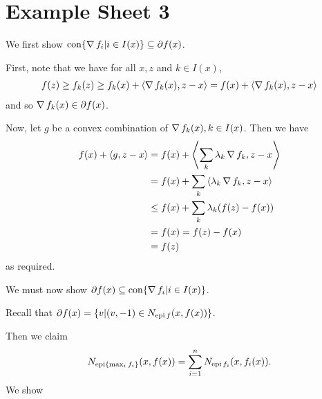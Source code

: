 
\chapter{Example Sheet 3}
\label{cha:example-sheet-3}

\begin{exercises}
\item
\item
  We first show $\operatorname*{con} \{ \operatorname*{\nabla} f_{i} | i \in I(x) \}
  \subseteq \partial f(x)$.

  First, note that we have for all $x, z$ and $k \in I(x)$,
  \begin{align}
    \label{eq:41}
    f(z) \geq f_{k}(z) \geq f_{k}(x) + \IP{\grad f_{k}(x), z -x} =
    f(x) + \IP{\grad f_{k}(x), z-x}
  \end{align} 
  and so $\operatorname*{\nabla} f_{k}(x) \in \partial f(x)$. 

  Now, let $g$ be a convex combination of $\operatorname*{\nabla} f_{k}(x), k \in
  I(x)$.  Then we have
  \begin{align}
    \label{eq:42}
    f(x) + \IP{g, z-x} &= f(x) + \IP{\sum_{k} \lambda_{k} \grad f_{k},
      z-x} \\
    &= f(x) + \sum_{k} \IP{\lambda_{k} \grad f_{k}, z - x} \\
    &\leq f(x) + \sum_{k} \lambda_{k} (f(z) - f(x)) \\
    &= f(x) = f(z) - f(x) \\
    &= f(z)
  \end{align} as required.

  We must now show $\partial f(x) \subseteq \operatorname*{con} \{ \operatorname*{\nabla} f_{i} | i
  \in I(x) \}$.

  Recall that $\partial f(x) = \{ v | (v, -1) \in N_{\operatorname*{epi} f}(x, f(x))
  \}$.

  Then we claim
  \begin{align}
    \label{eq:51}
    N_{\operatorname*{epi} \{ \max_{i} f_{i}  \}} (x, f(x)) = \sum_{i=1}^{n} N_{\operatorname*{epi}
      f_{i}} (x, f_{i}(x)).
  \end{align} We show



\end{exercises}
